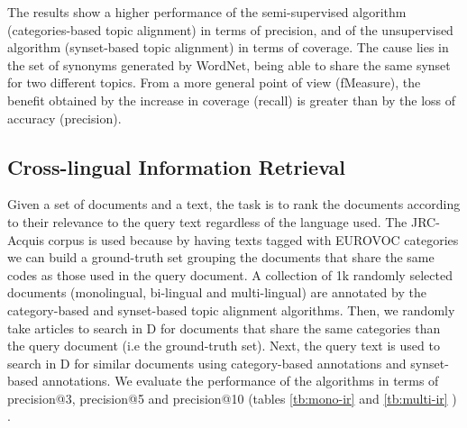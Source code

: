 The results show a higher performance of the semi-supervised algorithm (categories-based topic alignment) in terms of precision, and of the unsupervised algorithm (synset-based topic alignment) in terms of coverage. The cause lies in the set of synonyms generated by WordNet, being able to share the same synset for two different topics. From a more general point of view (fMeasure), the benefit obtained by the increase in coverage (recall) is greater than by the loss of accuracy (precision).


\subsection{Cross-lingual Information Retrieval}
\label{sec:cl-inf-retrieval}
Given a set of documents and a text, the task is to rank the documents according to their relevance to the query text regardless of the language used. The JRC-Acquis corpus is used because by having texts tagged with EUROVOC categories we can build a ground-truth set grouping the documents that share the same codes as those used in the query document. A collection of 1k randomly selected documents (monolingual, bi-lingual and multi-lingual) are annotated by the category-based and synset-based topic alignment algorithms. Then, we randomly take articles to search in D for documents that share the same categories than the query document (i.e  the ground-truth set). Next, the query text is used to search in D for similar documents using category-based annotations and synset-based annotations. We evaluate the performance of the algorithms in terms of precision@3, precision@5 and precision@10 (tables \ref{tb:mono-ir} and \ref{tb:multi-ir} ) .

